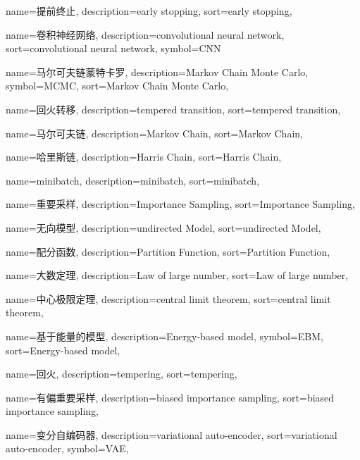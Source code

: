 {
  name=提前终止,
  description={early stopping},
  sort={early stopping},
}

{
  name=卷积神经网络,
  description={convolutional neural network},
  sort={convolutional neural network},
  symbol={CNN}
}

{
  name=马尔可夫链蒙特卡罗,
  description={Markov Chain Monte Carlo},
  symbol={MCMC},
  sort={Markov Chain Monte Carlo},
}

{
  name=回火转移,
  description={tempered transition},
  sort={tempered transition},
}

{
  name=马尔可夫链,
  description={Markov Chain},
  sort={Markov Chain},
}

{
  name=哈里斯链,
  description={Harris Chain},
  sort={Harris Chain},
}

{
  name=minibatch,
  description={minibatch},
  sort={minibatch},
}

{
  name=重要采样,
  description={Importance Sampling},
  sort={Importance Sampling},
}

{
  name=无向模型,
  description={undirected Model},
  sort={undirected Model},
}

{
  name=配分函数,
  description={Partition Function},
  sort={Partition Function},
}

{
  name=大数定理,
  description={Law of large number},
  sort={Law of large number},
}

{
  name=中心极限定理,
  description={central limit theorem},
  sort={central limit theorem},
}

{
  name=基于能量的模型,
  description={Energy-based model},
  symbol={EBM},
  sort={Energy-based model},
}

{
  name=回火,
  description={tempering},
  sort={tempering},
}

{
  name=有偏重要采样,
  description={biased importance sampling},
  sort={biased importance sampling},
}

{
  name=变分自编码器,
  description={variational auto-encoder},
  sort={variational auto-encoder},
  symbol={VAE},
}

